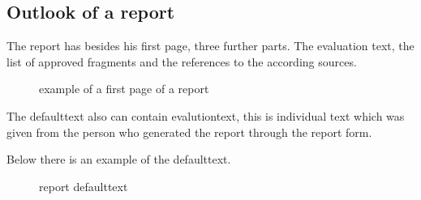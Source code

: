 \subsection{Outlook of a report}

The report has besides his first page, three further parts. The evaluation text, the list of approved fragments and the references to the according sources.

\begin{figure}[!h]
  \centering
  \caption{example of a first page of a report}
  \label{fig:report_deckblatt}
\end{figure}

\pagebreak

The defaulttext also can contain evalutiontext, this is individual text which was given from the person who generated the report through the report form.
\pagebreak

Below there is an example of the defaulttext.

\begin{figure}[!h]
  \centering
  \caption{report defaulttext}
  \label{fig:report_default_evaluation_tex}
\end{figure}
\pagebreak

